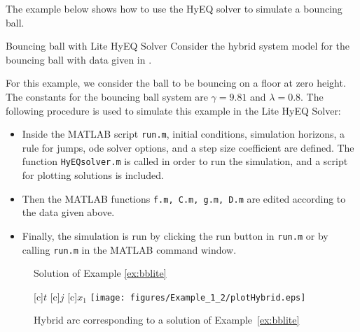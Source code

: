The example below shows how to use the HyEQ solver to simulate a bouncing ball.

\begin{example}{Bouncing ball with Lite HyEQ Solver}
\label{ex:bblite} Consider the hybrid system model for the bouncing ball with 
data given in .

For this example, we consider the ball to be bouncing on a floor at zero height. 
The constants for the bouncing ball system are $\gamma = 9.81$ and $\lambda=0.8$.
The following procedure is used to simulate this example in the Lite HyEQ Solver:
\begin{itemize}
\item Inside the MATLAB script {\tt run.m}, initial conditions, simulation horizons, 
      a rule for jumps, ode solver options, and a step size coefficient are defined. 
      The function {\tt HyEQsolver.m} is called in order to run the simulation, 
      and a script for plotting solutions is included.
\item Then the MATLAB functions {\tt f.m, C.m, g.m, D.m} 
      are edited according to the data given above.
\item Finally, the simulation is run by clicking the run button in {\tt run.m} 
      or by calling {\tt run.m} in the MATLAB command window.
\end{itemize}

\begin{figure}[ht]
\begin{center}
\hfill
{}
\end{center}
\caption{Solution of Example \ref{ex:bblite}
}
\end{figure}

\begin{figure}[ht]
  \begin{center}
  [c]{$t$}
  [c]{$j$}
  [c]{$x_1$}
    \texttt{[image: figures/Example\_1\_2/plotHybrid.eps]}
    \caption{Hybrid arc corresponding to a solution of Example~\ref{ex:bblite}
    }
    \label{fig:lite-3}
  \end{center}
\end{figure} 


\end{example}
